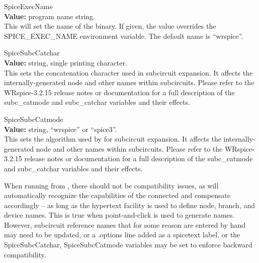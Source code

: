 \begin{description}
\item{\et SpiceExecName}\\
{\bf Value:} program name string.\\
This will set the name of the {\WRspice} binary.  If given, the value
overrides the {\et SPICE\_EXEC\_NAME} environment variable.  The
default name is ``{\vt wrspice}''.

\item{\et SpiceSubcCatchar}\\
{\bf Value:} string, single printing character.\\
This sets the concatenation character used in {\WRspice} subcircuit
expansion.  It affects the internally-generated node and other names
within subcircuits.  Please refer to the WRspice-3.2.15 release notes
or documentation for a full description of the {\WRspice} {\et
subc\_catmode} and {\et subc\_catchar} variables and their effects.

\item{\et SpiceSubcCatmode}\\
{\bf Value:} string, ``{\vt wrspice}'' or ``{\vt spice3}''.\\
This sets the algorithm used by {\WRspice} for subcircuit expansion. 
It affects the internally-generated node and other names within
subcircuits.  Please refer to the WRspice-3.2.15 release notes or
documentation for a full description of the {\WRspice} {\et
subc\_catmode} and {\et subc\_catchar} variables and their effects.
\end{description}

When running {\WRspice} from {\Xic}, there should not be
compatibility issues, as {\Xic} will automatically recognize the
capabilities of the connected {\WRspice} and compensate accordingly
-- as long as the hypertext facility is used to define node, branch,
and device names.  This is true when point-and-click is used to
generate names.  However, subcircuit reference names that for some
reason are entered by hand may need to be updated, or a {\vt
.options} line added as a spicetext label, or the {\et
SpiceSubcCatchar}, {\et SpiceSubcCatmode} variables may be set to
enforce backward compatibility.

